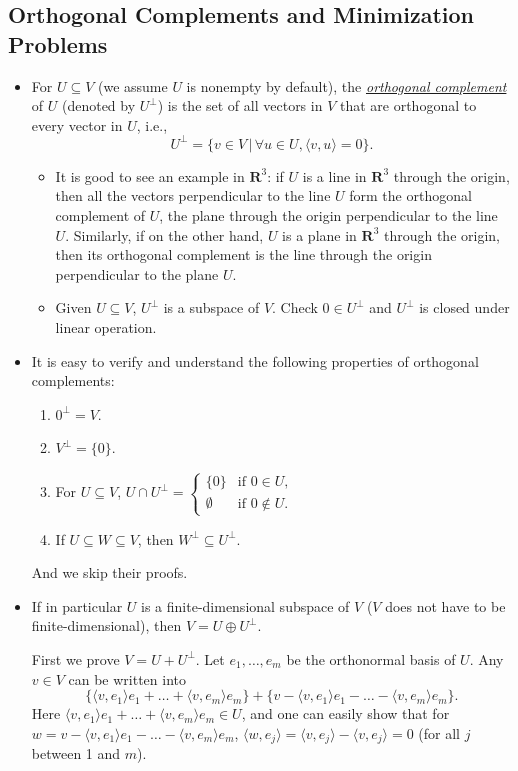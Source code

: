 \documentclass[11pt]{article}
\newcommand{\where}{\,|\,}
\newcommand{\df}[1]{\ul{\textit{\textsf{#1}}}}
\newcommand{\R}{\mathbf{R}}
\newcommand{\inp}[2]{\langle #1, #2 \rangle}
\begin{document}
\subsection{Orthogonal Complements and Minimization Problems}
\begin{itemize}
    \item For $U \subseteq V$ (we assume $U$ is nonempty by default), the \df{orthogonal complement} of $U$ (denoted by $U^\perp$) is the set of all vectors in $V$ that are orthogonal to every vector in $U$, i.e., $$U^\perp = \{v \in V \where \forall u \in U, \inp{v}{u}=0\}.$$
    \begin{itemize}
        \item It is good to see an example in $\R^3$: if $U$ is a line in $\R^3$ through the origin, then all the vectors perpendicular to the line $U$ form the orthogonal complement of $U$, the plane through the origin perpendicular to the line $U$. Similarly, if on the other hand, $U$ is a plane in $\R^3$ through the origin, then its orthogonal complement is the line through the origin perpendicular to the plane $U$.
        \item Given $U \subseteq V$, $U^\perp$ is a subspace of $V$. Check $0 \in U^\perp$ and $U^\perp$ is closed under linear operation.
    \end{itemize}
    \item It is easy to verify and understand the following properties of orthogonal complements:
    \begin{enumerate}[label=(\alph*)]
        \item $0^\perp = V$.
        \item $V^\perp = \{0\}$.
        \item For $U \subseteq V$, $U \cap U^\perp = \left\{\begin{array}{rl} \{0\} & \text{if } 0 \in U, \\ \emptyset \;\, & \text{if } 0 \notin U. \end{array} \right.$
        \item If $U \subseteq W \subseteq V$, then $W^\perp \subseteq U^\perp$.
    \end{enumerate}
    And we skip their proofs.
    \item If in particular $U$ is a finite-dimensional subspace of $V$ ($V$ does not have to be finite-dimensional), then $V = U \oplus U^\perp$.
    
    First we prove $V = U + U^\perp$. Let $e_1,\dots,e_m$ be the orthonormal basis of $U$. Any $v \in V$ can be written into $$\{\inp{v}{e_1}e_1+\dots+\inp{v}{e_m}e_m\} + \{v - \inp{v}{e_1}e_1-\dots-\inp{v}{e_m}e_m\}.$$ Here $\inp{v}{e_1}e_1+\dots+\inp{v}{e_m}e_m \in U$, and one can easily show that for $w = v - \inp{v}{e_1}e_1-\dots-\inp{v}{e_m}e_m$, $\inp{w}{e_j} = \inp{v}{e_j} - \inp{v}{e_j} = 0$ (for all $j$ between 1 and $m$).
    

\end{itemize}
\end{document}
